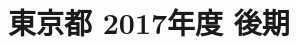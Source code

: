 \documentclass[../../hsm_tok_q.tex]{subfiles}
\begin{document}
    \section{東京都 2017年度 後期}
    \subsection{　}
    
    \newpage
    \subsection{　}
    
    \newpage
    \subsection{　}
    
    \newpage
    \subsection{　}
    
    \newpage
    \subsection{　}
    
\end{document}
